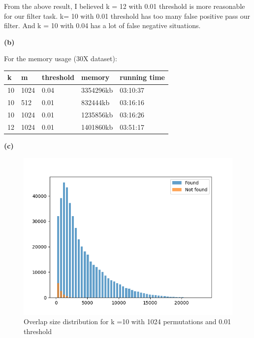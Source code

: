 \documentclass[11pt]{article}
\renewcommand\part[1]{\vspace{.10in}\textbf{(#1)}}
\begin{document}
From the above result, I believed k = 12 with 0.01 threshold is more reasonable for our filter task. k= 10 with 0.01 threshold has too many false positive pass our filter. And k = 10 with 0.04 has a lot of false negative situations.

\part{b}

For the memory usage (30X dataset):

\begin{center} 
	\begin{tabular}{ | l | l | l | l | l |} 
		\hline k & m & threshold & memory & running time \\ 
		\hline 10 & 1024 & 0.04 & 3354296kb & 03:10:37 \\ 
		\hline 10 & 512 & 0.01 & 832444kb & 03:16:16 \\ 
		\hline 10 & 1024 &0.01 & 1235856kb & 03:16:26 \\ 
		\hline 12 & 1024 &0.01 & 1401860kb & 03:51:17\\ 
		\hline 
	\end{tabular} 
\end{center}

\part{c}

\begin{figure}[H]
\centering
\includegraphics[width = .8\textwidth]{Ecoli_Pacbio_simulate_30X_k10_1024_0p01.png}
\caption{Overlap size distribution for k =10 with 1024 permutations and 0.01 threshold}
\label{fig1}
\end{figure}
\end{document}
